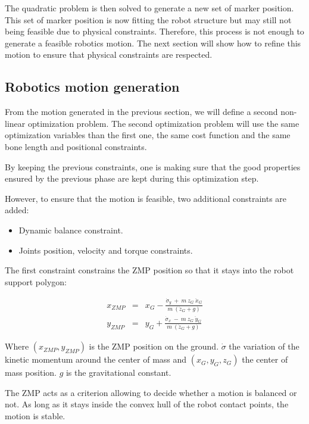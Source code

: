 \documentclass[letterpaper, 10 pt, conference]{ieeeconf}  %
\begin{document}
The quadratic problem is then solved to generate a new set of marker
position. This set of marker position is now fitting the robot
structure but may still not being feasible due to physical
constraints. Therefore, this process is not enough to generate a
feasible robotics motion. The next section will show how to refine
this motion to ensure that physical constraints are respected.


\subsection{Robotics motion generation}


From the motion generated in the previous section, we will define a
second non-linear optimization problem. The second optimization
problem will use the same optimization variables than the first one,
the same cost function and the same bone length and positional
constraints.


By keeping the previous constraints, one is making sure that the good
properties ensured by the previous phase are kept during this
optimization step.


However, to ensure that the motion is feasible, two additional
constraints are added:
\begin{itemize}
\item Dynamic balance constraint.
\item Joints position, velocity and torque constraints.
\end{itemize}


The first constraint constrains the ZMP position so that it stays into
the robot support polygon:

\begin{equation}
  \begin{array}{ccc}
    x_{ZMP} &=& x_G - \frac{\dot{\sigma}_y\ +\ m\ z_G\ \ddot{x}_G}{m\ (\ddot{z}_G + g)} \\
    y_{ZMP} &=& y_G + \frac{\dot{\sigma}_x\ -\ m\ z_G\ \ddot{y}_G}{m\ (\ddot{z}_G + g)}
    \end{array}
\end{equation}

Where $(x_{ZMP}, y_{ZMP})$ is the ZMP position on the
ground. $\dot{\sigma}$ the variation of the kinetic momentum around
the center of mass and $(x_G, y_G, z_G)$ the center of mass position. $g$ is the gravitational constant.

The ZMP acts as a criterion allowing to decide whether a motion is
balanced or not. As long as it stays inside the convex hull of the
robot contact points, the motion is stable.
\end{document}
